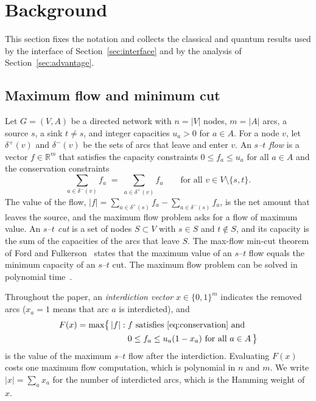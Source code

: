 \section{Background}\label{sec:background}

This section fixes the notation and collects the classical and quantum results used by the interface of Section~\ref{sec:interface} and by the analysis of Section~\ref{sec:advantage}.

\subsection{Maximum flow and minimum cut}\label{sec:bg-flow}

Let $G=(V,A)$ be a directed network with $n=|V|$ nodes, $m=|A|$ arcs, a source $s$, a sink $t\neq s$, and integer capacities $u_a>0$ for $a\in A$. For a node $v$, let $\delta^{+}(v)$ and $\delta^{-}(v)$ be the sets of arcs that leave and enter $v$. An \emph{$s$--$t$ flow} is a vector $f\in\mathbb{R}^{m}$ that satisfies the capacity constraints $0\le f_a\le u_a$ for all $a\in A$ and the conservation constraints
\begin{equation}\label{eq:conservation}
  \sum_{a\in\delta^{-}(v)} f_a \;=\; \sum_{a\in\delta^{+}(v)} f_a \qquad \text{for all } v\in V\setminus\{s,t\}.
\end{equation}
The value of the flow, $|f|=\sum_{a\in\delta^{+}(s)}f_a-\sum_{a\in\delta^{-}(s)}f_a$, is the net amount that leaves the source, and the maximum flow problem asks for a flow of maximum value. An \emph{$s$--$t$ cut} is a set of nodes $S\subset V$ with $s\in S$ and $t\notin S$, and its capacity is the sum of the capacities of the arcs that leave $S$. The max-flow min-cut theorem of Ford and Fulkerson~\cite{fordfulkerson1956} states that the maximum value of an $s$--$t$ flow equals the minimum capacity of an $s$--$t$ cut. The maximum flow problem can be solved in polynomial time~\cite{ahuja1993}.

Throughout the paper, an \emph{interdiction vector} $x\in\{0,1\}^{m}$ indicates the removed arcs ($x_a=1$ means that arc $a$ is interdicted), and
\begin{equation}\label{eq:F}
  \begin{aligned}
  F(x) = \max\bigl\{\, |f| :{}& f \text{ satisfies \eqref{eq:conservation} and}\\
  & 0\le f_a\le u_a(1-x_a)\ \text{for all } a\in A \,\bigr\}
  \end{aligned}
\end{equation}
is the value of the maximum $s$--$t$ flow after the interdiction. Evaluating $F(x)$ costs one maximum flow computation, which is polynomial in $n$ and $m$. We write $|x|=\sum_{a}x_a$ for the number of interdicted arcs, which is the Hamming weight of $x$.

